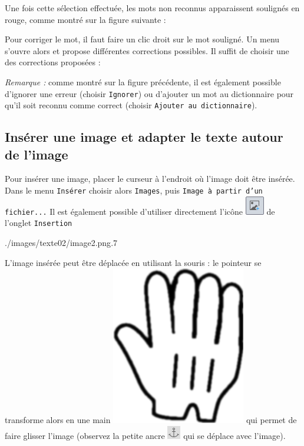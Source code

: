 
Une fois cette sélection effectuée, les mots non reconnus apparaissent soulignés en rouge, comme montré sur la figure suivante :


Pour corriger le mot, il faut faire un clic droit sur le mot souligné. Un menu s'ouvre alors et propose différentes corrections possibles. Il suffit de choisir une des corrections proposées :


\emph{Remarque :} comme montré sur la figure précédente, il est également possible d'ignorer une erreur (choisir \texttt{Ignorer}) ou d'ajouter un mot au dictionnaire pour qu'il soit reconnu comme correct (choisir \texttt{Ajouter au dictionnaire}).    



\subsection{Insérer une image et adapter le texte autour de l'image}\label{Texte2InsererImage}

Pour insérer une image, placer le curseur à l'endroit où l'image doit être insérée. Dans le menu \texttt{Insérer} choisir alors \texttt{Images}, puis \texttt{Image à partir d'un fichier...} Il est également possible d'utiliser directement l'icône \includegraphics[width=.6cm]{./images/texte02/iconeInsererImage} de l'onglet \texttt{Insertion}

%
              {./images/texte02/image2.png}{.7\textwidth}

L'image insérée peut être déplacée en utilisant la souris : le pointeur se transforme alors en une main \includegraphics[width=.3cm]{./images/texte02/pointeurMain} qui permet de faire glisser l'image (observez la petite ancre \includegraphics[width=.4cm]{./images/texte02/iconeAncre} qui se déplace avec l'image).\\



